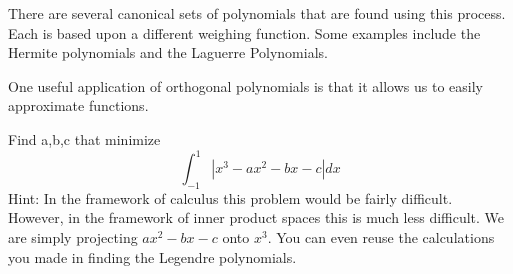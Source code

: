 There are several canonical sets of polynomials that are found using this process. Each is based upon a different weighing function. Some examples include the Hermite polynomials and the Laguerre Polynomials.

One useful application of orthogonal polynomials is that it allows us to easily approximate functions.

\begin{problem}
Find a,b,c that minimize
\[
\int_{-1}^1 |x^3-ax^2-bx-c| dx
\]
Hint: In the framework of calculus this problem would be fairly difficult. However, in the framework of inner product spaces this is much less difficult. We are simply projecting $ax^2-bx-c$ onto $x^3$. You can even reuse the calculations you made in finding the Legendre polynomials.
\end{problem}
